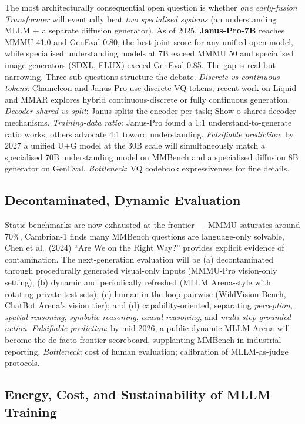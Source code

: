 \documentclass{article}
\begin{document}
The most architecturally consequential open question is whether \emph{one early-fusion Transformer} will eventually beat \emph{two specialised systems} (an understanding MLLM + a separate diffusion generator). As of 2025, \textbf{Janus-Pro-7B} reaches MMMU 41.0 and GenEval 0.80, the best joint score for any unified open model, while specialised understanding models at 7B exceed MMMU 50 and specialised image generators (SDXL, FLUX) exceed GenEval 0.85. The gap is real but narrowing. Three sub-questions structure the debate. \emph{Discrete vs continuous tokens}: Chameleon and Janus-Pro use discrete VQ tokens; recent work on Liquid and MMAR explores hybrid continuous-discrete or fully continuous generation. \emph{Decoder shared vs split}: Janus splits the encoder per task; Show-o shares decoder mechanisms. \emph{Training-data ratio}: Janus-Pro found a 1:1 understand-to-generate ratio works; others advocate 4:1 toward understanding. \emph{Falsifiable prediction}: by 2027 a unified U+G model at the 30B scale will simultaneously match a specialised 70B understanding model on MMBench and a specialised diffusion 8B generator on GenEval. \emph{Bottleneck}: VQ codebook expressiveness for fine details.

\subsection{Decontaminated, Dynamic Evaluation}\label{decontaminated-dynamic-evaluation}

Static benchmarks are now exhausted at the frontier --- MMMU saturates around 70\%, Cambrian-1 finds many MMBench questions are language-only solvable, Chen et al.~(2024) ``Are We on the Right Way?'' provides explicit evidence of contamination. The next-generation evaluation will be (a) decontaminated through procedurally generated visual-only inputs (MMMU-Pro vision-only setting); (b) dynamic and periodically refreshed (MLLM Arena-style with rotating private test sets); (c) human-in-the-loop pairwise (WildVision-Bench, ChatBot Arena's vision tier); and (d) capability-oriented, separating \emph{perception}, \emph{spatial reasoning}, \emph{symbolic reasoning}, \emph{causal reasoning}, and \emph{multi-step grounded action}. \emph{Falsifiable prediction}: by mid-2026, a public dynamic MLLM Arena will become the de facto frontier scoreboard, supplanting MMBench in industrial reporting. \emph{Bottleneck}: cost of human evaluation; calibration of MLLM-as-judge protocols.

\subsection{Energy, Cost, and Sustainability of MLLM Training}\label{energy-cost-and-sustainability-of-mllm-training}
\end{document}
